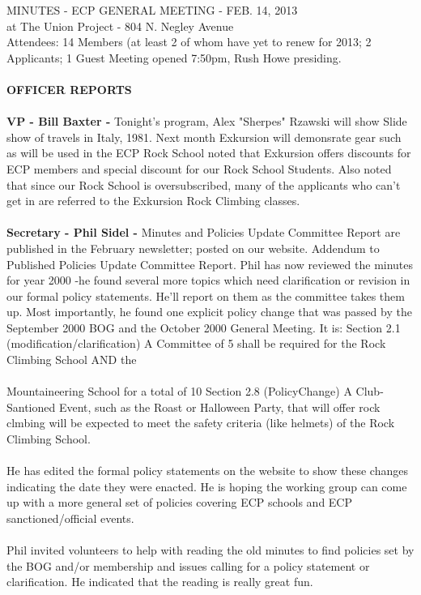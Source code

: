 \documentclass[10pt,a4paper]{article}
\begin{document}
MINUTES - ECP GENERAL MEETING - FEB. 14, 2013\\
at The Union Project - 804 N. Negley Avenue\\
Attendees:  14 Members (at least 2 of whom have yet to renew for 2013; 2 Applicants; 1 Guest
Meeting opened 7:50pm, Rush Howe presiding.
\\
\\
\textbf{OFFICER REPORTS}\\
\\
\textbf{VP - Bill Baxter - }Tonight's program, Alex "Sherpes" Rzawski will show Slide show of travels in Italy, 1981.  Next month Exkursion will demonsrate gear such as will be used in the ECP Rock School noted that Exkursion offers discounts for ECP members	and special discount for our Rock School Students.	Also noted that since our Rock School is oversubscribed, many of the applicants who can't get in  are referred to the Exkursion Rock Climbing classes.
\\
\\
\textbf{Secretary - Phil Sidel -}  Minutes and Policies Update Committee Report are published in the February newsletter; posted on our website. Addendum to Published Policies Update Committee Report. Phil has now reviewed the minutes for year 2000 -he found several more topics which need clarification or revision in our formal policy statements.  He'll report on them as the committee  takes them up. Most importantly, he found one explicit policy change that was passed by the September 2000 BOG and the October 2000 General Meeting.  It is: Section 2.1 (modification/clarification) A Committee of 5 shall be required for the Rock Climbing School AND the 
\\
\\
Mountaineering School for a total of 10 Section 2.8 (PolicyChange) A Club-Santioned Event, such as the Roast or Halloween Party, that will offer rock clmbing will be expected to meet the safety criteria (like helmets) of the Rock Climbing School. 
\\
\\
He has edited the formal policy statements on the website to show these changes indicating the date they were enacted.  He is hoping the working group can come up with a more general set of policies covering ECP schools and ECP sanctioned/official events.
\\
\\
Phil invited volunteers to help with reading the old minutes to find policies set by the BOG and/or membership and issues calling for a policy statement or clarification.  He indicated that the reading is really great fun.
\end{document}

